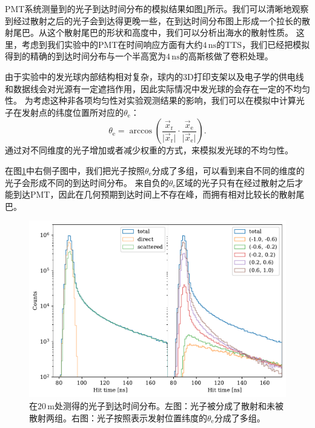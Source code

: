 PMT系统测量到的光子到达时间分布的模拟结果如图\ref{fig:pathfinder_sim_PMT_dist}所示。我们可以清晰地观察到经过散射之后的光子会到达得更晚一些，在到达时间分布图上形成一个拉长的散射尾巴。从这个散射尾巴的形状和高度中，我们可以分析出海水的散射性质\cite{OP_ANTARES:2004, OP_IceCube:2006, OP_IceCube:2013}。
这里，考虑到我们实验中的PMT在时间响应方面有大约$4\,\mathrm{ns}$的TTS，我们已经把模拟得到的精确的到达时间分布与一个半高宽为$4\,\mathrm{ns}$的高斯核做了卷积处理。

由于实验中的发光球内部结构相对复杂，球内的3D打印支架以及电子学的供电线和数据线会对光源有一定遮挡作用，因此实际情况中发光球的会存在一定的不均匀性\cite{pathfinder_light_source:2022}。
为考虑这种非各项均匀性对实验观测结果的影响，我们可以在模拟中计算光子在发射点的纬度位置所对应的$\theta_\mathrm{e}$：
\begin{equation}
    \theta_\mathrm{e} = \arccos \left( \frac{\vec{x}_\mathrm{r}}{\vert\vec{x}_\mathrm{r}\vert} \cdot \frac{\vec{x}_\mathrm{e}}{\vert\vec{x}_\mathrm{e}\vert}  \right) .
    \label{eq:latitude}
\end{equation}
通过对不同维度的光子增加或者减少权重的方式，来模拟发光球的不均匀性。

在图\ref{fig:pathfinder_sim_PMT_dist}中右侧子图中，我们把光子按照$\theta_\mathrm{e}$分成了多组，可以看到来自不同的维度的光子会形成不同的到达时间分布。
来自负的$\theta_\mathrm{e}$区域的光子只有在经过散射之后才能到达PMT，因此在几何预期到达时间上不存在峰，而拥有相对比较长的散射尾巴。

\begin{figure}[htp]
    \centering
    \includegraphics[width=1.0\linewidth]{img/pathfinder_sim_PMT_dist.pdf}
    \caption{在$20\,\mathrm{m}$处测得的光子到达时间分布。左图：光子被分成了散射和未被散射两组。右图：光子按照表示发射位置纬度的$\theta_\mathrm{e}$分成了多组。}
    \label{fig:pathfinder_sim_PMT_dist}
\end{figure}

